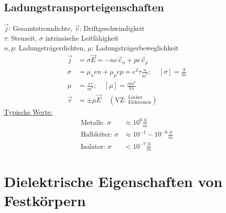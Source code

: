 \documentclass[a4paper,twocolumn,10pt]{article}
\begin{document}
\subsection{Ladungstransporteigenschaften}
$\overrightarrow{j}$: Gesamtstromdichte, $\overrightarrow{v}$: Driftgeschwindigkeit\\
$\tau$: Steuzeit, $\sigma$ intrinsische Leitfähigkeit\\
$n,p$: Ladungsträgerdichten, $\mu$: Ladungsträgerbeweglichkeit
\begin{equation*}
\begin{split}
\overrightarrow{j}&=\sigma\overrightarrow{E}=-ne\overrightarrow{v}_n+pe\overrightarrow{v}_p\\
\sigma &=\mu_nen+\mu_pep=e^2\tau\frac{n}{m^*};\;\;\;\;[\sigma]=\frac{S}{m}\\
\mu &=\frac{e\tau}{m^*};\;\;\;\;[\mu]=\frac{cm^2}{Vs}\\
\overrightarrow{v}&=\pm \mu\overrightarrow{E}\;\;\;\;(\text{VZ: }_{\text{Elektronen}}^{\text{Löcher}})
\end{split}
\end{equation*}
\underline{Typische Werte:}
\begin{equation*}
\begin{split}
\text{Metalle: }\sigma&\approx 10^6\frac{S}{m}\\
\text{Halbleiter: }\sigma&\approx 10^{-1}-10^{-6}\frac{S}{m}\\
\text{Isolator: }\sigma&<10^{-7}\frac{S}{m}
\end{split}
\end{equation*}

\section{Dielektrische Eigenschaften von Festkörpern}
\end{document}
